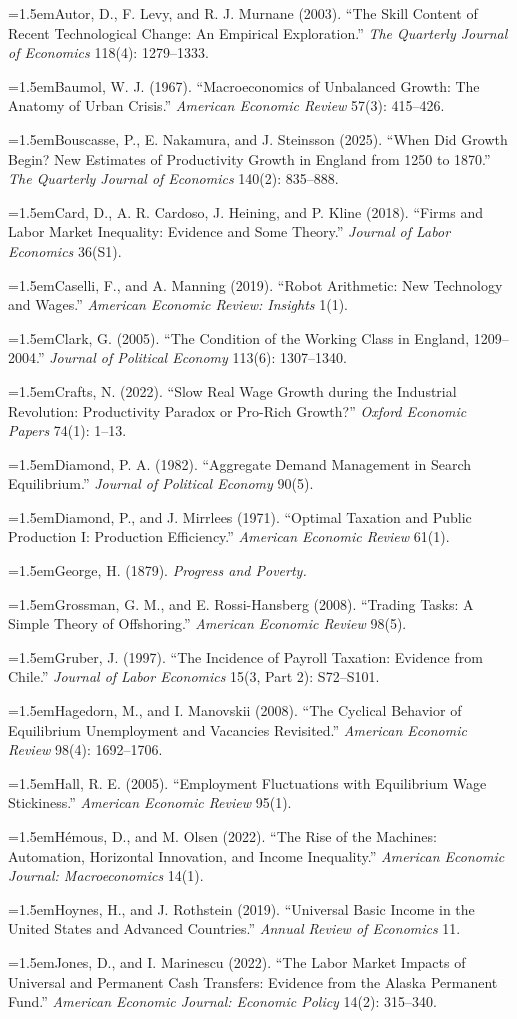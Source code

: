 \documentclass[12pt]{article}
\theoremstyle{plain}
\newcommand{\refentry}[1]{\par\hangindent=1.5em\hangafter=1\noindent #1}
\begin{document}
{\refentry{Autor, D., F. Levy, and R. J. Murnane (2003). ``The Skill Content of Recent Technological Change: An Empirical Exploration.'' \emph{The Quarterly Journal of Economics} 118(4): 1279--1333.}
\refentry{Baumol, W. J. (1967). ``Macroeconomics of Unbalanced Growth: The Anatomy of Urban Crisis.'' \emph{American Economic Review} 57(3): 415--426.}
\refentry{Bouscasse, P., E. Nakamura, and J. Steinsson (2025). ``When Did Growth Begin? New Estimates of Productivity Growth in England from 1250 to 1870.'' \emph{The Quarterly Journal of Economics} 140(2): 835--888.}
\refentry{Card, D., A. R. Cardoso, J. Heining, and P. Kline (2018). ``Firms and Labor Market Inequality: Evidence and Some Theory.'' \emph{Journal of Labor Economics} 36(S1).}
\refentry{Caselli, F., and A. Manning (2019). ``Robot Arithmetic: New Technology and Wages.'' \emph{American Economic Review: Insights} 1(1).}
\refentry{Clark, G. (2005). ``The Condition of the Working Class in England, 1209--2004.'' \emph{Journal of Political Economy} 113(6): 1307--1340.}
\refentry{Crafts, N. (2022). ``Slow Real Wage Growth during the Industrial Revolution: Productivity Paradox or Pro-Rich Growth?'' \emph{Oxford Economic Papers} 74(1): 1--13.}
\refentry{Diamond, P. A. (1982). ``Aggregate Demand Management in Search Equilibrium.'' \emph{Journal of Political Economy} 90(5).}
\refentry{Diamond, P., and J. Mirrlees (1971). ``Optimal Taxation and Public Production I: Production Efficiency.'' \emph{American Economic Review} 61(1).}
\refentry{George, H. (1879). \emph{Progress and Poverty.}}
\refentry{Grossman, G. M., and E. Rossi-Hansberg (2008). ``Trading Tasks: A Simple Theory of Offshoring.'' \emph{American Economic Review} 98(5).}
\refentry{Gruber, J. (1997). ``The Incidence of Payroll Taxation: Evidence from Chile.'' \emph{Journal of Labor Economics} 15(3, Part 2): S72--S101.}
\refentry{Hagedorn, M., and I. Manovskii (2008). ``The Cyclical Behavior of Equilibrium Unemployment and Vacancies Revisited.'' \emph{American Economic Review} 98(4): 1692--1706.}
\refentry{Hall, R. E. (2005). ``Employment Fluctuations with Equilibrium Wage Stickiness.'' \emph{American Economic Review} 95(1).}
\refentry{Hémous, D., and M. Olsen (2022). ``The Rise of the Machines: Automation, Horizontal Innovation, and Income Inequality.'' \emph{American Economic Journal: Macroeconomics} 14(1).}
\refentry{Hoynes, H., and J. Rothstein (2019). ``Universal Basic Income in the United States and Advanced Countries.'' \emph{Annual Review of Economics} 11.}
\refentry{Jones, D., and I. Marinescu (2022). ``The Labor Market Impacts of Universal and Permanent Cash Transfers: Evidence from the Alaska Permanent Fund.'' \emph{American Economic Journal: Economic Policy} 14(2): 315--340.}
}
\end{document}
